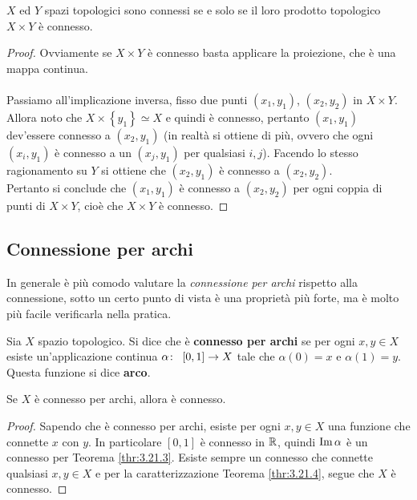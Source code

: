 \begin{theorem}
	$X$ ed $Y$ spazi topologici sono connessi se e solo se il loro prodotto topologico $X\times Y$ è connesso.
\end{theorem} 
\begin{proof}
	Ovviamente se $X\times Y$ è connesso basta applicare la proiezione, che è una mappa continua. \\ \\ 
	Passiamo all'implicazione inversa, fisso due punti $(x_1, y_1)$, $(x_2, y_2)$ in $X \times Y$. Allora noto che $X \times \left\{y_1\right\} \simeq X$ e quindi è connesso, pertanto $(x_1, y_1)$ dev'essere connesso a $(x_2, y_1)$ (in realtà si ottiene di più, ovvero che ogni $(x_i, y_1)$ è connesso a un $(x_j, y_1)$ per qualsiasi $i,j$). Facendo lo stesso ragionamento su $Y$ si ottiene che $(x_2, y_1)$ è connesso a $(x_2, y_2)$. \\ Pertanto si conclude che $(x_1, y_1)$ è connesso a $(x_2, y_2)$ per ogni coppia di punti di $X \times Y$, cioè che $X \times Y$ è connesso.
\end{proof}



\subsection{\textcolor{TopGener}{\textbf{Connessione per archi}}}


In generale è più comodo valutare la \textit{connessione per archi} rispetto alla connessione, sotto un certo punto di vista è una proprietà più forte, ma è molto più facile verificarla nella pratica.
\begin{definition}
	Sia $X$ spazio topologico. Si dice che è \textbf{connesso per archi} se per ogni $x, y \in X$ esiste un'applicazione continua $\alpha \colon\ \left[0,1\right] \rightarrow X$ tale che $\alpha(0)=x$ e $\alpha(1)=y$. Questa funzione si dice \textbf{arco}.
\end{definition} 

\begin{theorem}
	Se $X$ è connesso per archi, allora è connesso.
\end{theorem}
\begin{proof}
	Sapendo che è connesso per archi, esiste per ogni $x,y \in X$ una funzione che connette $x$ con $y$. In particolare $\left[0,1\right]$ è connesso in $\mathbb{R}$, quindi $\operatorname{Im}{\alpha}$ è un connesso per Teorema \ref{thr:3.21.3}. Esiste sempre un connesso che connette qualsiasi $x,y \in X$ e per la caratterizzazione Teorema \ref{thr:3.21.4}, segue che $X$ è connesso.
\end{proof}


